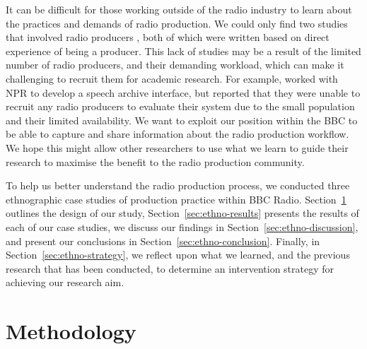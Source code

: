 
It can be difficult for those working outside of the radio industry to learn about the practices and demands of radio
production.  We could only find two studies that involved radio producers \citep{Dunaway2000,Barbour2004}, both of
which were written based on direct experience of being a producer. This lack of studies may be a result of the limited
number of radio producers, and their demanding workload, which can make it challenging to recruit them for academic
research. For example, \citet{Kim2003} worked with NPR to develop a speech archive interface, but reported that they
were unable to recruit any radio producers to evaluate their system due to the small population and their limited
availability.  We want to exploit our position within the BBC to be able to capture and share information about the
radio production workflow. We hope this might allow other researchers to use what we learn to guide their research to
maximise the benefit to the radio production community.


To help us better understand the radio production process, we conducted three ethnographic case studies of production
practice within BBC Radio.  Section~\ref{sec:ethno-method} outlines the design of our study,
Section~\ref{sec:ethno-results} presents the results of each of our case studies, we discuss our findings in
Section~\ref{sec:ethno-discussion}, and present our conclusions in Section~\ref{sec:ethno-conclusion}.  Finally, in
Section~\ref{sec:ethno-strategy}, we reflect upon what we learned, and the previous research that has been conducted,
to determine an intervention strategy for achieving our research aim.

\section{Methodology}\label{sec:ethno-method}



